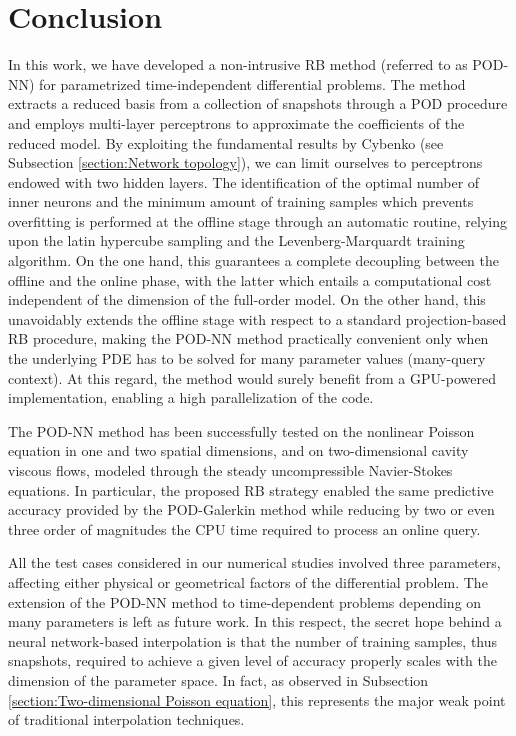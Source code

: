 \documentclass{elsarticle}
\numberwithin{equation}{section}
\theoremstyle{theorem}
\theoremstyle{definition}
\theoremstyle{remark}
\theoremstyle{proposition}
\numberwithin{figure}{section}
\begin{document}
	
	
	\section{Conclusion}
	\label{section:Conclusion}	
	
		In this work, we have developed a non-intrusive RB method (referred to as POD-NN) for parametrized time-independent differential problems. The method extracts a reduced basis from a collection of snapshots through a POD procedure and employs multi-layer perceptrons to approximate the coefficients of the reduced model. By exploiting the fundamental results by Cybenko (see Subsection \ref{section:Network topology}), we can limit ourselves to perceptrons endowed with two hidden layers. The identification of the optimal number of inner neurons and the minimum amount of training samples which prevents overfitting is performed at the offline stage through an automatic routine, relying upon the latin hypercube sampling and the Levenberg-Marquardt training algorithm. On the one hand, this guarantees a complete decoupling between the offline and the online phase, with the latter which entails a computational cost independent of the dimension of the full-order model. On the other hand, this unavoidably extends the offline stage with respect to a standard projection-based RB procedure, making the POD-NN method practically convenient only when the underlying PDE has to be solved for many parameter values (many-query context). At this regard, the method would surely benefit from a GPU-powered implementation, enabling a high parallelization of the code.
		
		The POD-NN method has been successfully tested on the nonlinear Poisson equation in one and two spatial dimensions, and on two-dimensional cavity viscous flows, modeled through the steady uncompressible Navier-Stokes equations. In particular, the proposed RB strategy enabled the same predictive accuracy provided by the POD-Galerkin method while reducing by two or even three order of magnitudes the CPU time required to process an online query. %
		
		All the test cases considered in our numerical studies involved three parameters, affecting either physical or geometrical factors of the differential problem. The extension of the POD-NN method to time-dependent problems depending on many parameters is left as future work. In this respect, the secret hope behind a neural network-based interpolation is that the number of training samples, thus snapshots, required to achieve a given level of accuracy properly scales with the dimension of the parameter space. In fact, as observed in Subsection \ref{section:Two-dimensional Poisson equation}, this represents the major weak point of traditional interpolation techniques.
		
\end{document}

